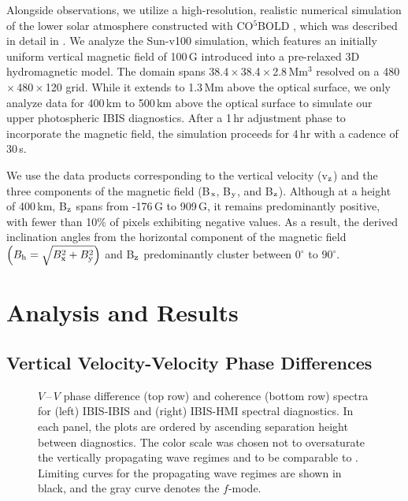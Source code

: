 \documentclass[preprint2,linenumbers]{aastex701}
\begin{document}
Alongside observations, we utilize a high-resolution, realistic numerical simulation of the lower solar atmosphere constructed with CO$^{5}$BOLD \citep{2012_Freytag_COBOLD}, which was described in detail in \citet{2019_Vigeesh_Roth_Steiner_Jackiewicz}.
We analyze the Sun-v100 simulation, which features an initially uniform vertical magnetic field of 100\,G introduced into a pre-relaxed 3D hydromagnetic model.
The domain spans 38.4\,$\times$\,38.4\,$\times$\,2.8\,Mm$^{3}$ resolved on a 480\,$\times$\,480\,$\times$\,120 grid.
While it extends to 1.3\,Mm above the optical surface, we only analyze data for 400\,km to 500\,km above the optical surface to simulate our upper photospheric IBIS diagnostics.
After a 1\,hr adjustment phase to incorporate the magnetic field, the simulation proceeds for 4\,hr with a cadence of 30\,s.

We use the data products corresponding to the vertical velocity (v$_{\rm{z}}$) and the three components of the magnetic field (B$_{\rm{x}}$, B$_{\rm{y}}$, and B$_{\rm{z}}$).
Although at a height of 400\,km, B$_{\rm{z}}$ spans from -176\,G to 909\,G, it remains predominantly positive, with fewer than 10$\%$ of pixels exhibiting negative values.
As a result, the derived inclination angles from the horizontal component of the magnetic field $\left( B_{\rm{h}} = \sqrt{ B_{\rm{x}}^2 + B_{\rm{y}}^2} \right)$ and B$_{\rm{z}}$ predominantly cluster between $0^\circ$ to $90^\circ$.


\section{Analysis and Results} \label{sec:results}


\subsection{Vertical Velocity-Velocity Phase Differences} \label{subsec:vv_phases_differences}

\begin{figure}[hbt!]
\caption{$V$\,--\,$V$ phase difference (top row) and coherence (bottom row) spectra for (left) IBIS-IBIS and (right) IBIS-HMI spectral diagnostics. In each panel, the plots are ordered by ascending separation height between diagnostics. The color scale was chosen not to oversaturate the vertically propagating wave regimes and to be comparable to . Limiting curves for the propagating wave regimes are shown in black, and the gray curve denotes the $f$-mode.}
\end{figure}
\end{document}
